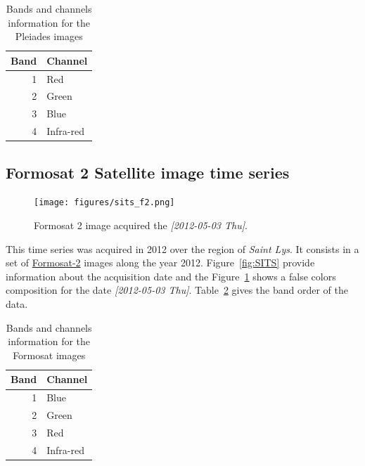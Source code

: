 \documentclass[a4paper,11pt,DIV=18]{scrartcl}
\begin{document}
\begin{table}[htbp]
\caption{\label{tab:org97da3a2}
Bands and channels information for the Pleiades images}
\centering
\begin{tabular}{rl}
\toprule
Band & Channel\\
\midrule
1 & Red\\
2 & Green\\
3 & Blue\\
4 & Infra-red\\
\bottomrule
\end{tabular}
\end{table}

\subsection{Formosat 2 Satellite image time series}
\label{sec:orgfdb8371}
\begin{figure}[htbp]
\centering
\texttt{[image: figures/sits\_f2.png]}
\caption{\label{fig:org8e2f625}
Formosat 2 image acquired the \textit{[2012-05-03 Thu]}.}
\end{figure}

This time series was acquired in 2012 over the region of \emph{Saint Lys}. It
consists  in  a  set  of   \href{http://www.satimagingcorp.com/satellite-sensors/other-satellite-sensors/formosat-2/}{Formosat-2}  images  along  the  year  2012.
Figure~\ref{fig:SITS} provide information  about the acquisition
date and the Figure~\ref{fig:org8e2f625} shows a false colors composition for
the  date \textit{[2012-05-03 Thu]}. Table~\ref{tab:orgc0024b1}  gives the
band order of the data.

\begin{table}[htbp]
\caption{\label{tab:orgc0024b1}
Bands and channels information for the Formosat images}
\centering
\begin{tabular}{rl}
\toprule
Band & Channel\\
\midrule
1 & Blue\\
2 & Green\\
3 & Red\\
4 & Infra-red\\
\bottomrule
\end{tabular}
\end{table}
\end{document}
